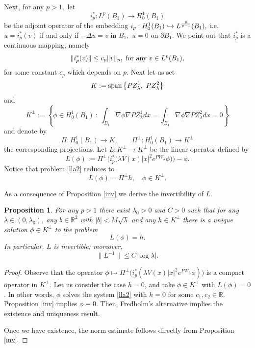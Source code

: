 \documentclass[reqno,11pt]{amsart}
\newtheorem{prop}[thm]{Proposition}
\theoremstyle{definition}
\numberwithin{equation}{section}
\newcommand{\R}{\mathbb{R}}
\newcommand{\la}{\lambda}
\newcommand{\into}{\int_{B_1}}
\renewcommand{\(}{\left(}
\renewcommand{\)}{\right)}
\renewcommand{\[}{\left[}
\renewcommand{\]}{\right]}
\newcommand{\beq}{\begin{equation}}
\newcommand{\eeq}{\end{equation}}
\begin{document}
{\

Next, for any $ p>1,$ let $$i^*_{p}:L^{p}(B_1)\to H^1_0(B_1)$$ be the
adjoint operator of the embedding
$i_{p}:H^1_0(B_1)\hookrightarrow L^{p\over p-1 }(B_1),$ i.e.
$u=i^*_{p}(v)$ if and only if $-\Delta u=v$ in $B_1,$ $u=0$ on
$\partial B_1.$ We point out that $i^*_{p}$ is a continuous
mapping, namely
\begin{equation}
\label{isp} \|i^*_{p}(v)\| \le c_{p} \|v\|_{p}, \ \hbox{for any} \ v\in L^{p}(B_1),
\end{equation}
for some constant $c_{p}$ which depends on $p.$
Next let us set
$$      {K }:=\hbox{span}\left\{PZ^1_{\la},\ PZ^2_{\la}\right\}$$
and
$$      {K ^\perp }:= \left\{\phi\in H^1_0(B_1)\ :\ \into \nabla \phi \nabla PZ^1_{\la}dx= \into \nabla \phi \nabla PZ^2_{\la}dx= 0\right\} $$
and  denote by
$$     \Pi : H^1_0(B_1)\to       {K },\qquad      {\Pi ^\perp}: H^1_0(B_1)\to       {K ^\perp }$$
the corresponding projections.
Let $      L: K^\perp \to K^\perp$  be the
linear operator defined by
\beq\label{elle}
      L(     \phi):=  \Pi^{\perp}\Big(   {i^*_{p}}\big(       \la V(x)|x|^{2}e^{PW_\la}     \phi \big)\Big) - \phi. 
\eeq
Notice that problem \eqref{lla2} reduces to $$L(\phi)=\Pi^\perp h, \quad \phi\in K^\perp.$$
 
 As a consequence of Proposition \ref{inv} we derive the invertibility of $L$.

\begin{prop}\label{ex} For any $p>1$ there exist $\lambda_0>0$ and $C>0$ such that for any $\la \in(0, \la_0)$, any $b\in\R^2$ with $|b|<M\sqrt\la$ and 
 any $h\in K^\perp$  there is a unique solution $ \phi\in K^\perp$ to the problem $$L(\phi)=h.$$ In
particular, $L$ is invertible; moreover, $$\| L^{-1} \| \leq C
|\log \lambda |.$$

\end{prop}
\begin{proof}  Observe that the operator $\phi\mapsto \Pi^\perp\big( {i^*_{p}}\(       \la V(x)|x|^{2}e^{PW_\la}     \phi \)\big)$ is a compact operator in $K^\perp$.
   Let us consider the case $h=0$, and take $\phi\in K^\perp$ with $L(\phi)=0$. In other words,  $\phi$ solves
the system \eqref{lla2} with $h=0$ for some $c_1,c_2\in\R$. Proposition \ref{inv} implies $\phi\equiv 0$. Then, Fredholm's alternative implies the existence and uniqueness result.

Once we have existence, the norm estimate follows directly from Proposition \ref{inv}.
\end{proof}







}
\end{document}
